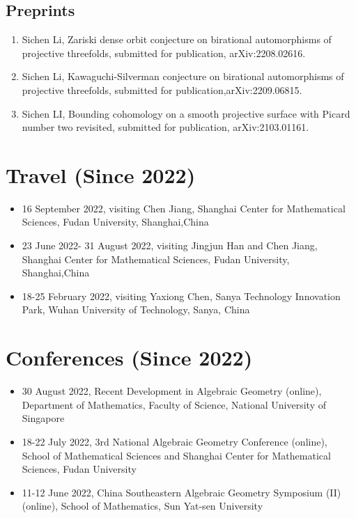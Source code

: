 \documentclass{resume}
\begin{document}
\subsection{\bf Preprints}
\begin{enumerate}
\item Sichen Li, Zariski dense orbit conjecture on birational automorphisms of projective threefolds, submitted for publication, arXiv:2208.02616.
\item Sichen Li, Kawaguchi-Silverman conjecture on birational automorphisms of projective threefolds, submitted for publication,arXiv:2209.06815.
\item Sichen LI, Bounding cohomology on a smooth projective surface with Picard number two revisited, submitted for publication, arXiv:2103.01161.
\end{enumerate}
\section{\bf Travel (Since 2022)}
\begin{itemize}
\item 16 September 2022, visiting Chen Jiang, Shanghai Center for Mathematical Sciences, Fudan University, Shanghai,China
\item 23 June 2022- 31 August 2022,  visiting Jingjun Han and Chen Jiang, Shanghai Center for Mathematical Sciences, Fudan University, Shanghai,China
\item 18-25 February  2022, visiting Yaxiong Chen, Sanya Technology Innovation Park, Wuhan University of Technology, Sanya, China
\end{itemize}
\section{\bf Conferences (Since 2022)}
\begin{itemize}
\item  30 August 2022, Recent Development in Algebraic Geometry (online), Department of Mathematics, Faculty of Science, National University of Singapore
\item   18-22 July 2022, 3rd National Algebraic Geometry Conference (online), School of Mathematical Sciences and Shanghai Center for Mathematical Sciences, Fudan University
\item  11-12 June 2022,  China Southeastern Algebraic Geometry Symposium (II)(online), School of Mathematics, Sun Yat-sen University
\end{itemize}
\end{document}
